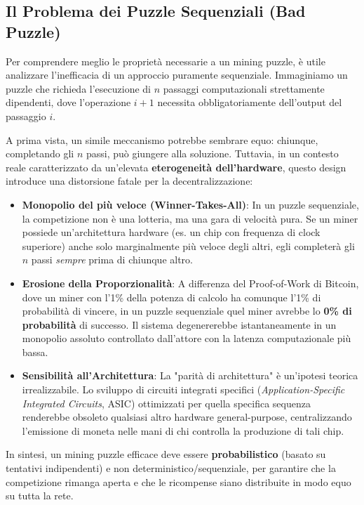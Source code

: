 \subsection{Il Problema dei Puzzle Sequenziali (Bad Puzzle)}

Per comprendere meglio le proprietà necessarie a un mining puzzle, è utile analizzare l'inefficacia di un approccio puramente sequenziale. Immaginiamo un puzzle che richieda l'esecuzione di $n$ passaggi computazionali strettamente dipendenti, dove l'operazione $i+1$ necessita obbligatoriamente dell'output del passaggio $i$. 

A prima vista, un simile meccanismo potrebbe sembrare equo: chiunque, completando gli $n$ passi, può giungere alla soluzione. Tuttavia, in un contesto reale caratterizzato da un'elevata \textbf{eterogeneità dell'hardware}, questo design introduce una distorsione fatale per la decentralizzazione:

\begin{itemize}
    \item \textbf{Monopolio del più veloce (Winner-Takes-All)}: In un puzzle sequenziale, la competizione non è una lotteria, ma una gara di velocità pura. Se un miner possiede un'architettura hardware (es. un chip con frequenza di clock superiore) anche solo marginalmente più veloce degli altri, egli completerà gli $n$ passi \textit{sempre} prima di chiunque altro.
    \item \textbf{Erosione della Proporzionalità}: A differenza del Proof-of-Work di Bitcoin, dove un miner con l'1\% della potenza di calcolo ha comunque l'1\% di probabilità di vincere, in un puzzle sequenziale quel miner avrebbe lo \textbf{0\% di probabilità} di successo. Il sistema degenererebbe istantaneamente in un monopolio assoluto controllato dall'attore con la latenza computazionale più bassa.
    \item \textbf{Sensibilità all'Architettura}: La "parità di architettura" è un'ipotesi teorica irrealizzabile. Lo sviluppo di circuiti integrati specifici (\textit{Application-Specific Integrated Circuits}, ASIC) ottimizzati per quella specifica sequenza renderebbe obsoleto qualsiasi altro hardware general-purpose, centralizzando l'emissione di moneta nelle mani di chi controlla la produzione di tali chip.
\end{itemize}

In sintesi, un mining puzzle efficace deve essere \textbf{probabilistico} (basato su tentativi indipendenti) e non deterministico/sequenziale, per garantire che la competizione rimanga aperta e che le ricompense siano distribuite in modo equo su tutta la rete.

